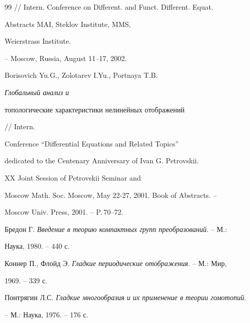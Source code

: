 \begin{thebibliography}{99}
// Intern. Conference on Different. and Funct. Different. Equat. 


Abstracts MAI, Steklov Institute, MMS, 


Weierstrass Institute. 


-- Moscow, Russia, August 11--17, 2002. 




Borisovich Yu.G., Zolotarev I.Yu., Portnaya T.B. {\em Глобальный анализ и 


топологические характеристики нелинейных отображений} // Intern.


Conference ``Differential Equations and Related Topics'' 


dedicated to the Centenary Anniversary of Ivan G. Petrovskii. 


XX Joint Session of Petrovskii Seminar and 


Moscow Math. Soc. Moscow, May 22-27, 2001. Book of Abstracts. -- 


Moscow Univ. Press, 2001. -- P.\,70--72. 




Бредон Г. {\em Введение в теорию компактных групп преобразований}. -- М.: 


Наука, 1980. -- 440 с. 




Коннер П., Флойд Э. {\em Гладкие периодические отображения}. -- М.: Мир, 


1969. -- 339 с. 




Понтрягин Л.С. {\em Гладкие многообразия и их применение в теории гомотопий}. 


-- М.: Наука, 1976. -- 176 с. 


 


\end{thebibliography} 


 


\vskip 2cm 


 






 


\label{end} 


 


